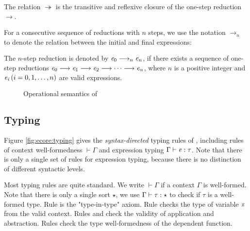 \begin{dfn}
    The relation $ \twoheadrightarrow $ is the transitive and reflexive closure of
    the one-step reduction $ \longrightarrow $.
\end{dfn}

For a consecutive sequence of reductions
with $n$ steps, we use the notation $ \longrightarrow_n $ to denote the relation
between the initial and final expressions:

\begin{dfn}
    The $n$-step reduction is denoted by $\mathit{e_{{\mathrm{0}}}}  \longrightarrow_n  \mathit{e_{\mathit{n}}}$, if
    there exists a sequence of one-step reductions $\mathit{e_{{\mathrm{0}}}}  \longrightarrow 
    \mathit{e_{{\mathrm{1}}}}  \longrightarrow  \mathit{e_{{\mathrm{2}}}}  \longrightarrow  \dots  \longrightarrow  \mathit{e_{\mathit{n}}}$, where $n$ is
    a positive integer and $\mathit{e_{\mathit{i}}}\,(i=0,1,\dots,n)$ are valid
    expressions.
\end{dfn}

\begin{figure}
    \ottdefnstep{}
    \caption{Operational semantics of \ecore}
    \label{fig:ecore:opsem}
\end{figure}

\subsection{Typing}\label{sec:ecore:type}

Figure \ref{fig:ecore:typing} gives the \emph{syntax-directed} typing
rules of \ecore, including rules of context well-formedness $\vdash  \Gamma$
and expression typing $\Gamma  \vdash  \mathit{e}  :  \tau$. Note that there is only a
single set of rules for expression typing, because there is no
distinction of different syntactic levels.

Most typing rules are quite standard. We write $\vdash  \Gamma$ if a context
$\Gamma$ is well-formed. Note that there is only a single sort
$\star$, we use $\Gamma  \vdash  \tau  :  \star$ to check if $\tau$ is a
well-formed type. Rule  is the "type-in-type"
axiom. Rule  checks the type of variable $\mathit{x}$ from
the valid context. Rules  and  check
the validity of application and abstraction. Rules 
check the type well-formedness of the dependent function.

